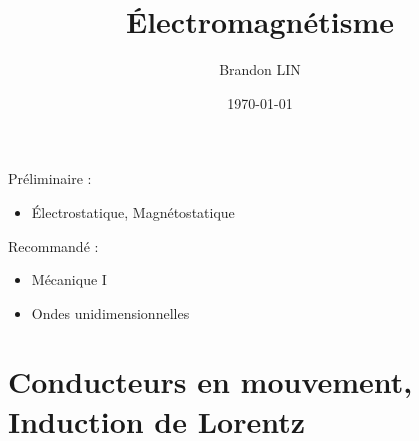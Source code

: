 \documentclass{report}
\title{\Huge{Électromagnétisme}}
\author{\huge{Brandon LIN}}
\date{\today}
\begin{document}
\maketitle

\begin{tcolorbox}
    Préliminaire :
    \begin{itemize}

        \item Électrostatique, Magnétostatique 

    \end{itemize}

    Recommandé : 
    \begin{itemize}

        
        \item Mécanique I 
        \item Ondes unidimensionnelles

    \end{itemize}
\end{tcolorbox}
\newpage%
\tableofcontents

\pagebreak







\chapter{Conducteurs en mouvement, Induction de Lorentz}

\end{document}
